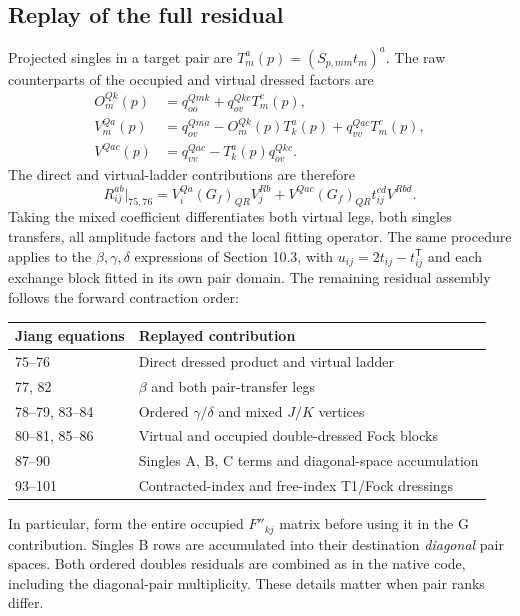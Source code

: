 \documentclass[11pt]{article}
\begin{document}
\subsection{Replay of the full residual}
Projected singles in a target pair are $T_m^a(p)=(S_{p,mm}t_m)^a$.
The raw counterparts of the occupied and virtual dressed factors are
\begin{align}
 O_m^{Qk}(p)&=q_{oo}^{Qmk}+q_{ov}^{Qkc}T_m^c(p),\\
 V_m^{Qa}(p)&=q_{ov}^{Qma}-O_m^{Qk}(p)T_k^a(p)
                            +q_{vv}^{Qac}T_m^c(p),\\
 V^{Qac}(p)&=q_{vv}^{Qac}-T_k^a(p)q_{ov}^{Qkc}.
\end{align}
The direct and virtual-ladder contributions are therefore
\begin{equation}
 R_{ij}^{ab}\big|_{75,76}
 =V_i^{Qa}(G_f)_{QR}V_j^{Rb}
       +V^{Qac}(G_f)_{QR}t_{ij}^{cd}V^{Rbd}.
\end{equation}
Taking the mixed coefficient differentiates both virtual legs, both singles
transfers, all amplitude factors and the local fitting operator. The same
procedure applies to the $\beta,\gamma,\delta$ expressions of Section 10.3,
with $u_{ij}=2t_{ij}-t_{ij}^{\mathsf T}$ and each exchange block fitted in
its own pair domain. The remaining residual assembly follows the forward
contraction order:
\begin{center}
\begin{tabular}{ll}
Jiang equations & Replayed contribution \\\hline
75--76 & Direct dressed product and virtual ladder \\
77, 82 & $\beta$ and both pair-transfer legs \\
78--79, 83--84 & Ordered $\gamma/\delta$ and mixed $J/K$ vertices \\
80--81, 85--86 & Virtual and occupied double-dressed Fock blocks \\
87--90 & Singles A, B, C terms and diagonal-space accumulation \\
93--101 & Contracted-index and free-index T1/Fock dressings
\end{tabular}
\end{center}
In particular, form the entire occupied $F''_{kj}$ matrix before using it
in the G contribution. Singles B rows are accumulated into their destination
\emph{diagonal} pair spaces. Both ordered doubles residuals are combined as
in the native code, including the diagonal-pair multiplicity. These details
matter when pair ranks differ.
\end{document}

